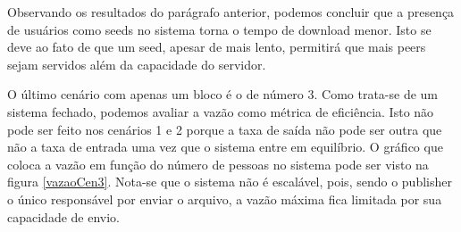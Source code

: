 \documentclass[a4paper,10pt]{article}
\begin{document}
Observando os resultados do parágrafo anterior, podemos concluir que a presença de usuários como seeds no sistema torna o tempo de download menor. Isto se deve ao fato de que um seed, apesar de mais lento, permitirá que mais peers sejam servidos além da capacidade do servidor.

O último cenário com apenas um bloco é o de número 3. Como trata-se de um sistema fechado, podemos avaliar a vazão como métrica de eficiência. Isto não pode ser feito nos cenários 1 e 2 porque a taxa de saída não pode ser outra que não a taxa de entrada uma vez que o sistema entre em equilíbrio. O gráfico que coloca a vazão em função do número de pessoas no sistema pode ser visto na figura \ref{vazaoCen3}. Nota-se que o sistema não é escalável, pois, sendo o publisher o único responsável por enviar o arquivo, a vazão máxima fica limitada por sua capacidade de envio.

\pagebreak

\begin{center}
	\begin{table}[h]
		\caption{pmf do número de pessoas no sistema com $\lambda = 0,1$}
		\label{tabPMFlamb0.1}
	\end{table}
\end{center}
\end{document}
